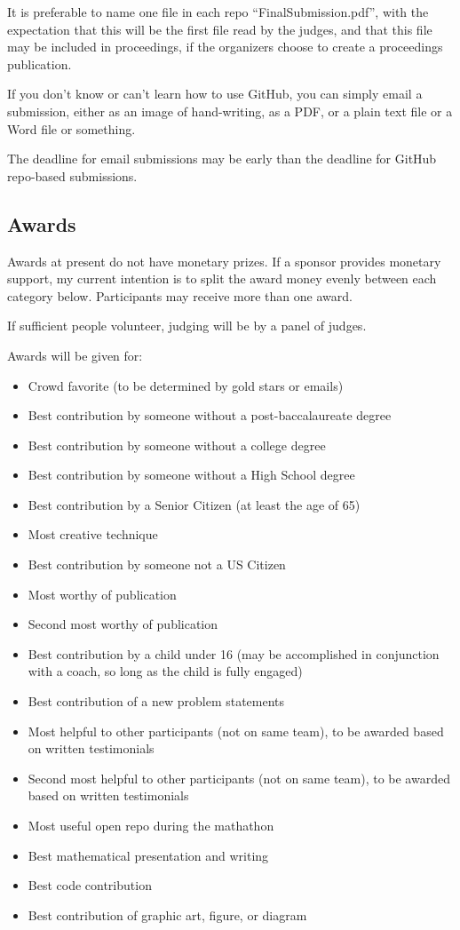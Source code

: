 \documentclass[11pt]{article}
\begin{document}
It is preferable to name one file in each repo ``FinalSubmission.pdf'', with the expectation that this
will be the first file read by the judges, and that this file may be included in proceedings, if the
organizers choose to create a proceedings publication.

If you don't know or can't learn how to use GitHub, you can simply email a submission,
either as an image of hand-writing, as a PDF, or a plain text file or a Word file or something.

The deadline for email submissions may be early than the deadline for GitHub repo-based submissions.

\subsection{Awards}

Awards at present do not have monetary prizes. If a sponsor provides monetary support, my current intention is to split
the award money evenly between each category below. Participants may receive more than one award.

If sufficient people volunteer, judging will be by a panel of judges.

Awards will be given for:
\begin{itemize}
\item Crowd favorite (to be determined by gold stars or emails)
\item Best contribution by someone without a post-baccalaureate degree
\item Best contribution by someone without a college degree
\item Best contribution by someone without a High School degree
\item Best contribution by a Senior Citizen (at least the age of 65)
\item Most creative technique
\item Best contribution by someone not a US Citizen
\item Most worthy of publication
\item Second most worthy of publication
\item Best contribution by a child under 16 (may be accomplished in conjunction with a coach, so long as the child is fully engaged)
\item Best contribution of a new problem statements
\item Most helpful to other participants (not on same team), to be awarded based on written testimonials
\item Second most helpful to other participants (not on same team), to be awarded based on written testimonials
\item Most useful open repo during the mathathon
\item Best mathematical presentation and writing
\item Best code contribution
\item Best contribution of graphic art, figure, or diagram
\end{itemize}
\end{document}
